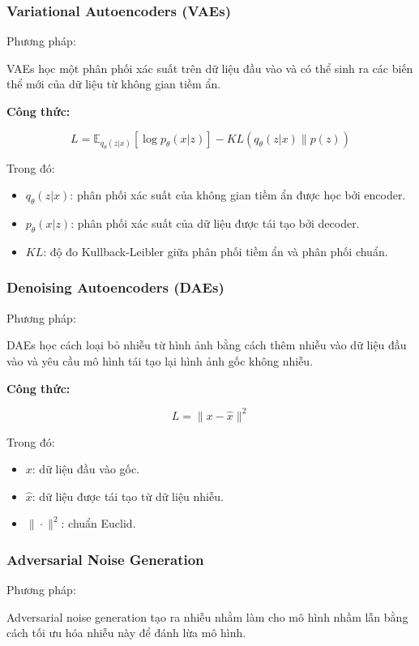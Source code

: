 \documentclass[12pt]{report}
\begin{document}
\subsubsection{Variational Autoencoders (VAEs)}

Phương pháp:  

VAEs học một phân phối xác suất trên dữ liệu đầu vào và có thể sinh ra các biến thể mới của dữ liệu từ không gian tiềm ẩn.

\textbf{Công thức:}

\[
L = \mathbb{E}_{q_\theta(z|x)}[\log p_\theta(x|z)] - KL(q_\theta(z|x) \| p(z))
\]

Trong đó:
\begin{itemize}
    \item \( q_\theta(z|x) \): phân phối xác suất của không gian tiềm ẩn được học bởi encoder.
    \item \( p_\theta(x|z) \): phân phối xác suất của dữ liệu được tái tạo bởi decoder.
    \item \( KL \): độ đo Kullback-Leibler giữa phân phối tiềm ẩn và phân phối chuẩn.
\end{itemize}

\subsubsection{Denoising Autoencoders (DAEs)}

Phương pháp:  

DAEs học cách loại bỏ nhiễu từ hình ảnh bằng cách thêm nhiễu vào dữ liệu đầu vào và yêu cầu mô hình tái tạo lại hình ảnh gốc không nhiễu.

\textbf{Công thức:}

\[
L = \|x - \hat{x}\|^2
\]

Trong đó:
\begin{itemize}
    \item \( x \): dữ liệu đầu vào gốc.
    \item \( \hat{x} \): dữ liệu được tái tạo từ dữ liệu nhiễu.
    \item \( \|\cdot\|^2 \): chuẩn Euclid.
\end{itemize}

\subsubsection{Adversarial Noise Generation}

Phương pháp:  

Adversarial noise generation tạo ra nhiễu nhằm làm cho mô hình nhầm lẫn bằng cách tối ưu hóa nhiễu này để đánh lừa mô hình.
\end{document}
